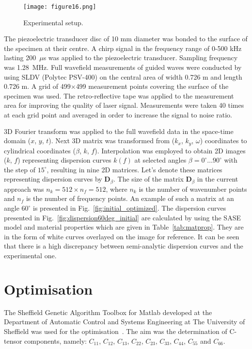 \documentclass[preprint,12pt]{elsarticle}
\newcommand{\matr}[1]{\mathbf{#1}} %
\begin{document}
	\begin{figure} [h!]
	\centering
	\texttt{[image: figure16.png]}
	\caption{Experimental setup.}
	\label{fig:setup}
\end{figure}
The piezoelectric transducer disc of 10 mm diameter was bonded to the surface of the specimen at their centre. 
A chirp signal in the frequency range of 0-500 kHz lasting 200~\(\mu\)s was applied to the piezoelectric transducer. 
Sampling frequency was 1.28~MHz. Full wavefield measurements of guided waves were conducted by using SLDV (Polytec PSV-400) on the central area of width 0.726 m and length 0.726 m. 
A grid of 499\(\times\)499 measurement points covering the surface of the specimen was used. 
The retro-reflective tape was applied to the measurement area for improving the quality of laser signal. 
Measurements were taken 40 times at each grid point and averaged in order to increase the signal to noise ratio.

3D Fourier transform was applied to the full wavefield data in the space-time domain 
(\(x\), \(y\), \(t\)).
 Next 3D matrix was transformed from (\(k_x\), \(k_y\), \(\omega\)) coordinates to cylindrical coordinates (\(\beta\), \(k\), \(f\)). 
Interpolation was employed to obtain 2D images (\(k\), \(f\)) representing dispersion curves \(k(f)\) at selected angles \(\beta = 0^{\circ} \ldots 90^{\circ}\) with the step of \(15^{\circ}\), resulting in nine 2D matrices. 
Let's denote these matrices representing dispersion curves by \(\matr{D}_{\beta}\). The size of the matrix  \(\matr{D}_{\beta}\) in the current approach was \(n_k=512 \times n_f= 512\), where \(n_k\) is the number of wavenumber points 
and \(n_f\) is the number of frequency points.  
An example of such a matrix at an angle \(60^{\circ}\) is presented in Fig.~\ref{fig:initial_optimized}. 
The dispersion curves presented in Fig.~\ref{fig:dispersion60deg_initial} are calculated by using the SASE model and material properties which are given in Table~\ref{tab:matprop}.
They are in the form of white curves overlayed on the image for reference. 
It can be seen that there is a high discrepancy between semi-analytic dispersion curves and the experimental one. 
	\section{Optimisation \label{sec:optimization}}
	The Sheffield Genetic Algorithm Toolbox for Matlab developed at the Department of Automatic Control and Systems Engineering at The University of Sheffield was used for the optimisation~\cite{Chipperfield1994}.
	The aim was the determination of C-tensor components, namely: \(C_{11}\), \(C_{12}\), \(C_{13}\),  \(C_{22}\), \(C_{23}\), \(C_{33}\), \(C_{44}\), \(C_{55}\) and \(C_{66}\).
\end{document}
